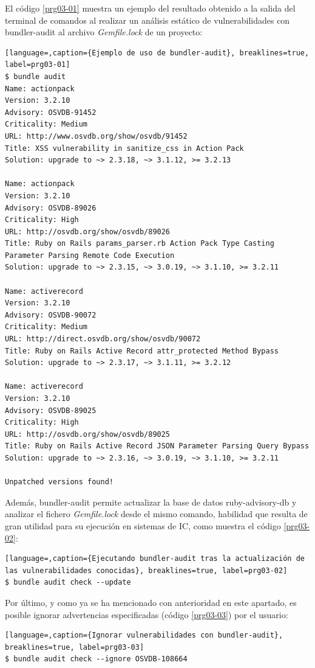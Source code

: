 El código \ref{prg03-01} muestra un ejemplo del resultado obtenido a la salida del terminal de comandos al realizar un análisis estático de vulnerabilidades con bundler-audit al archivo \textit{Gemfile.lock} de un proyecto:

\begin{lstlisting}[language=,caption={Ejemplo de uso de bundler-audit}, breaklines=true, label=prg03-01]
$ bundle audit
Name: actionpack
Version: 3.2.10
Advisory: OSVDB-91452
Criticality: Medium
URL: http://www.osvdb.org/show/osvdb/91452
Title: XSS vulnerability in sanitize_css in Action Pack
Solution: upgrade to ~> 2.3.18, ~> 3.1.12, >= 3.2.13

Name: actionpack
Version: 3.2.10
Advisory: OSVDB-89026
Criticality: High
URL: http://osvdb.org/show/osvdb/89026
Title: Ruby on Rails params_parser.rb Action Pack Type Casting Parameter Parsing Remote Code Execution
Solution: upgrade to ~> 2.3.15, ~> 3.0.19, ~> 3.1.10, >= 3.2.11

Name: activerecord
Version: 3.2.10
Advisory: OSVDB-90072
Criticality: Medium
URL: http://direct.osvdb.org/show/osvdb/90072
Title: Ruby on Rails Active Record attr_protected Method Bypass
Solution: upgrade to ~> 2.3.17, ~> 3.1.11, >= 3.2.12

Name: activerecord
Version: 3.2.10
Advisory: OSVDB-89025
Criticality: High
URL: http://osvdb.org/show/osvdb/89025
Title: Ruby on Rails Active Record JSON Parameter Parsing Query Bypass
Solution: upgrade to ~> 2.3.16, ~> 3.0.19, ~> 3.1.10, >= 3.2.11

Unpatched versions found!
\end{lstlisting}

Además, bundler-audit permite actualizar la base de datos ruby-advisory-db y analizar el fichero \textit{Gemfile.lock} desde el mismo comando, habilidad que resulta de gran utilidad para su ejecución en sistemas de \gls{IC}, como muestra el código \ref{prg03-02}:

\begin{lstlisting}[language=,caption={Ejecutando bundler-audit tras la actualización de las vulnerabilidades conocidas}, breaklines=true, label=prg03-02]
$ bundle audit check --update
\end{lstlisting}

Por último, y como ya se ha mencionado con anterioridad en este apartado, es posible ignorar advertencias especificadas (código \ref{prg03-03}) por el usuario:

\begin{lstlisting}[language=,caption={Ignorar vulnerabilidades con bundler-audit}, breaklines=true, label=prg03-03]
$ bundle audit check --ignore OSVDB-108664
\end{lstlisting}

